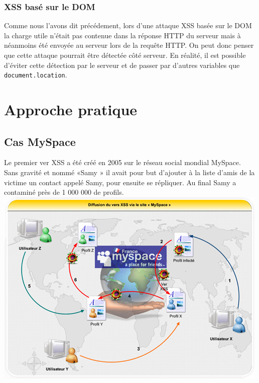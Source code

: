 \documentclass[a4paper,12pt]{report}
\begin{document}
    \subsection{XSS basé sur le DOM} %
    \label{sub:xss_bas_sur_le_dom}
    Comme nous l'avons dit précédement, lors d'une attaque XSS basée sur le DOM la charge utile n'était pas contenue dans la réponse HTTP du serveur mais à néanmoins été envoyée au serveur lors de la requête HTTP. On peut donc penser que cette attaque pourrait être détectée côté serveur. En réalité, il est possible d'éviter cette détection par le serveur et de passer par d'autres variables que \lstinline{document.location}.






    \newpage
  \chapter{Approche pratique} %

  \section{Cas MySpace}
Le premier ver XSS a été créé en 2005 sur le réseau social mondial MySpace. Sans gravité et nommé «Samy » il avait pour but d’ajouter à la liste d’amis de la victime un contact appelé Samy, pour ensuite se répliquer. Au final Samy a contaminé près de 1 000 000 de profils. \\

\includegraphics{images/versmyspace.jpg}\\
\end{document}
